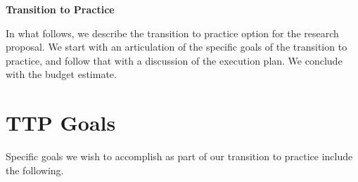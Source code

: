 \documentclass[11pt]{article}
\begin{document}
\pagestyle{plain}
\thispagestyle{plain}

\begin{center}
\textbf{\Large Transition to Practice}
\end{center}

In what follows, we describe the transition to practice option for the
research proposal.  We start with an articulation of the specific goals
of the transition to practice, and follow that with a discussion of the
execution plan.  We conclude with the budget estimate.

\section{TTP Goals}

Specific goals we wish to accomplish as part of our transition to practice
include the following.
\end{document}
